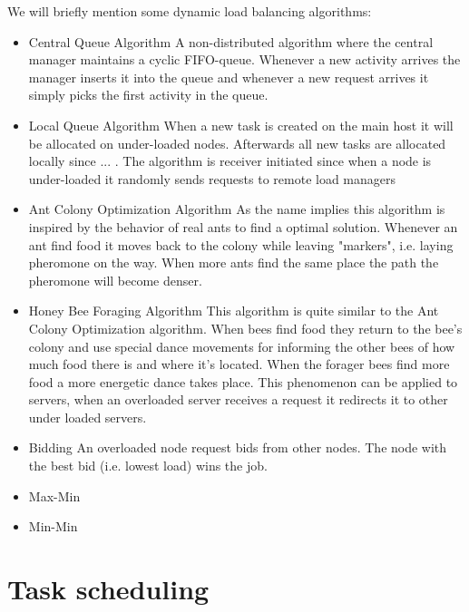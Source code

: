 \documentclass{cslthse-msc}
\begin{document}
We will briefly mention some dynamic load balancing algorithms: %

\begin{itemize}
\item Central Queue Algorithm A non-distributed algorithm where the central manager maintains a cyclic FIFO-queue. Whenever a new activity arrives the manager inserts it into the queue and whenever a new request arrives it simply picks the first activity in the queue. 

\item Local Queue Algorithm When a new task is created on the main host it will be allocated on under-loaded nodes. Afterwards all new tasks are allocated locally since ... \cite{perfAnalysisLoadCloud}. The algorithm is receiver initiated since when a node is under-loaded it randomly sends requests to remote load managers

\item Ant Colony Optimization Algorithm As the name implies this algorithm is inspired by the behavior of real ants to find a optimal solution. Whenever an ant find food it moves back to the colony while leaving "markers", i.e. laying pheromone on the way. When more ants find the same place the path the pheromone will become denser. 

\item Honey Bee Foraging Algorithm This algorithm is quite similar to the Ant Colony Optimization algorithm. When bees find food they return to the bee's colony and use special dance movements for informing the other bees of how much food there is and where it's located. When the forager bees find more food a more energetic dance takes place. This phenomenon can be applied to servers, when an overloaded server receives a request it redirects it to other under loaded servers.


\item Bidding An overloaded node request bids from other nodes. The node with the best bid (i.e. lowest load) wins the job.

\item Max-Min 

\item Min-Min 
\end{itemize}


\section{Task scheduling}
\end{document}
